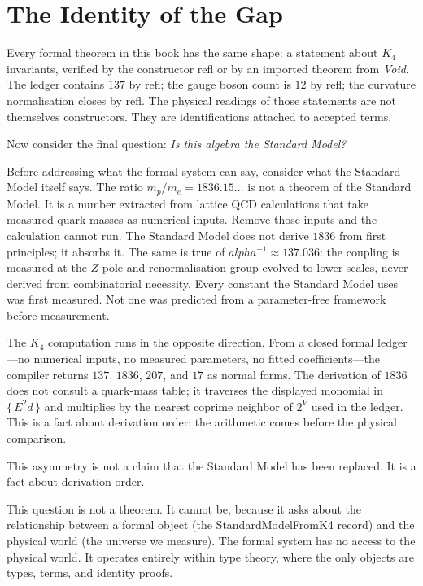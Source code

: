 \documentclass[11pt,a4paper]{book}
\def\alpha{alpha}%
\def\texttt#1{#1}%
\begin{document}
\section{The Identity of the Gap}
\label{sec:identity-of-the-gap}

Every formal theorem in this book has the same shape: a statement about $K_4$ invariants, verified by the constructor \texttt{refl} or by an imported theorem from \textit{Void}. The ledger contains $137$ by \texttt{refl}; the gauge boson count is $12$ by \texttt{refl}; the curvature normalisation closes by \texttt{refl}. The physical readings of those statements are not themselves constructors. They are identifications attached to accepted terms.

Now consider the final question: \emph{Is this algebra the Standard Model?}

Before addressing what the formal system can say, consider what the Standard Model itself says.  The ratio $m_p / m_e = 1836.15\ldots$ is not a theorem of the Standard Model.  It is a number extracted from lattice QCD calculations that take measured quark masses as numerical inputs.  Remove those inputs and the calculation cannot run.  The Standard Model does not derive $1836$ from first principles; it absorbs it.  The same is true of $\alpha^{-1} \approx 137.036$: the coupling is measured at the $Z$-pole and renormalisation-group-evolved to lower scales, never derived from combinatorial necessity.  Every constant the Standard Model uses was first measured.  Not one was predicted from a parameter-free framework before measurement.

The $K_4$ computation runs in the opposite direction.  From a closed formal ledger---no numerical inputs, no measured parameters, no fitted coefficients---the compiler returns $137$, $1836$, $207$, and $17$ as normal forms.  The derivation of $1836$ does not consult a quark-mass table; it traverses the displayed monomial in $\{\,E^2 d\,\}$ and multiplies by the nearest coprime neighbor of $2^V$ used in the ledger.  This is a fact about derivation order: the arithmetic comes before the physical comparison.

This asymmetry is not a claim that the Standard Model has been replaced.  It is a fact about derivation order.

This question is not a theorem. It cannot be, because it asks about the relationship between a formal object (the \texttt{StandardModelFromK4} record) and the physical world (the universe we measure). The formal system has no access to the physical world. It operates entirely within type theory, where the only objects are types, terms, and identity proofs.
\end{document}
